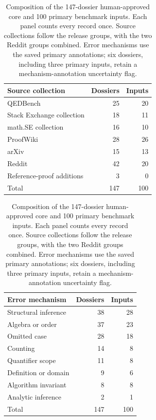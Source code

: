 \begin{table}[htbp]
\centering\small
\setlength{\tabcolsep}{3pt}
\begin{minipage}[t]{.48\linewidth}\centering
\begin{tabular}{@{}lrr@{}}
\toprule
Source collection & Dossiers & Inputs \\
\midrule
QEDBench & 25 & 20 \\
Stack Exchange collection & 18 & 11 \\
math.SE collection & 16 & 10 \\
ProofWiki & 28 & 26 \\
arXiv & 15 & 13 \\
Reddit & 42 & 20 \\
Reference-proof additions & 3 & 0 \\
\midrule
Total & 147 & 100 \\
\bottomrule
\end{tabular}
\end{minipage}\hfill
\begin{minipage}[t]{.50\linewidth}\centering
\begin{tabular}{@{}lrr@{}}
\toprule
Error mechanism & Dossiers & Inputs \\
\midrule
Structural inference & 38 & 28 \\
Algebra or order & 37 & 23 \\
Omitted case & 28 & 18 \\
Counting & 14 & 8 \\
Quantifier scope & 11 & 8 \\
Definition or domain & 9 & 6 \\
Algorithm invariant & 8 & 8 \\
Analytic inference & 2 & 1 \\
\midrule
Total & 147 & 100 \\
\bottomrule
\end{tabular}
\end{minipage}
\caption{Composition of the 147-dossier human-approved core and 100 primary
benchmark inputs. Each panel counts every record once. Source collections
follow the release groups, with the two Reddit groups combined. Error
mechanisms use the saved primary annotations; six dossiers, including
three primary inputs, retain a mechanism-annotation uncertainty flag.}
\label{tab:corpus-sources}
\end{table}

